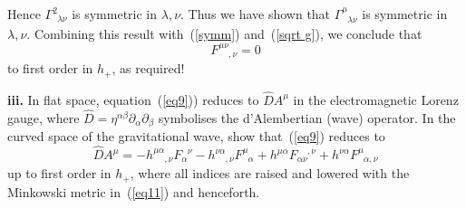 \documentclass[a4paper]{article} %
\newcommand{\ph}[1]{\phantom{#1}}
\begin{document}
Hence  $\Gamma^{2}_{\ph{2}\lambda\nu}$ is symmetric in $\lambda,\nu$. Thus we have shown that $\Gamma^{\mu}_{\ph{\mu}\lambda\nu}$ is symmetric in $\lambda,\nu$. Combining this result with~(\ref{symm}) and~(\ref{sqrt g}), we conclude that
\begin{equation}
F^{\mu\nu}_{\ph{\mu\nu},\nu}=0 \label{eq9}
\end{equation}
to first order in $h_+$, as required!


\begin{framed}
\textbf{iii.} In flat space, equation~(\ref{eq9})) reduces to $\hat{D}A^\mu$ in the electromagnetic Lorenz gauge, where $\hat{D}=\eta^{\alpha\beta}\partial_{\alpha}\partial_{\beta}$ symbolises the d'Alembertian (wave) operator. In the curved space of the gravitational wave, show that~(\ref{eq9}) reduces to
\begin{equation}
\hat{D}A^{\mu}=-h^{\mu\alpha}_{\ph{\mu\alpha},\nu}F_{\alpha}^{\ph{\alpha}\nu}-h^{\nu\alpha}_{\ph{\nu\alpha},\nu}
F^{\mu}_{\ph{\mu}\alpha}+h^{\mu\alpha} F_{\alpha\nu}^{\ph{\alpha\nu},\nu}+h^{\nu\alpha} F^{\mu}_{\ph{\mu}\alpha,\nu}\label{eq11}
\end{equation}
up to first order in $h_+$, where all indices are raised and lowered with the Minkowski metric in~(\ref{eq11}) and henceforth.
\end{framed}
\end{document}
